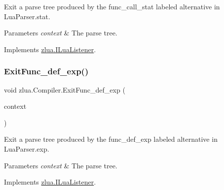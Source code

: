 Exit a parse tree produced by the {\ttfamily func\+\_\+call\+\_\+stat} labeled alternative in Lua\+Parser.\+stat. 


\begin{DoxyParams}{Parameters}
{\em context} & The parse tree.\\
\hline
\end{DoxyParams}


Implements \mbox{\hyperlink{interfacezlua_1_1_i_lua_listener_ab9aba8c96896e86ec76ca5a87c5d2f25}{zlua.\+I\+Lua\+Listener}}.

\mbox{\label{classzlua_1_1_compiler_a52eac177380013cc2c8751c4bee9d1dc}} 
\subsubsection{\texorpdfstring{Exit\+Func\+\_\+def\+\_\+exp()}{ExitFunc\_def\_exp()}}
{\footnotesize\ttfamily void zlua.\+Compiler.\+Exit\+Func\+\_\+def\+\_\+exp (\begin{DoxyParamCaption}\item[{\mbox{[}\+Not\+Null\mbox{]} \mbox{\hyperlink{classzlua_1_1_lua_parser_1_1_func__def__exp_context}{Lua\+Parser.\+Func\+\_\+def\+\_\+exp\+Context}}}]{context }\end{DoxyParamCaption})}



Exit a parse tree produced by the {\ttfamily func\+\_\+def\+\_\+exp} labeled alternative in Lua\+Parser.\+exp. 


\begin{DoxyParams}{Parameters}
{\em context} & The parse tree.\\
\hline
\end{DoxyParams}


Implements \mbox{\hyperlink{interfacezlua_1_1_i_lua_listener_aa77991290b4d2ef6e498e68343ad8b28}{zlua.\+I\+Lua\+Listener}}.

\mbox{\label{classzlua_1_1_compiler_a3c652ebce04bd5127161319606311859}} 
